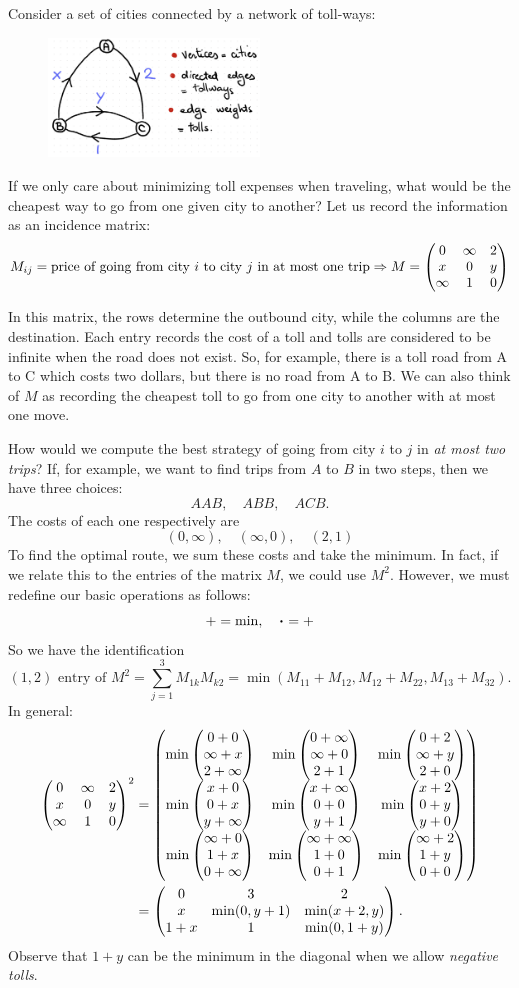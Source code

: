 \documentclass[12pt]{memoir}
\theoremstyle{definition}
\begin{document}
Consider a set of cities connected by a network of toll-ways:
\begin{figure}[h!]
    \centering
    \includegraphics[width=0.5\textwidth]{figs/fig1-2.png}
\end{figure}

If we only care about minimizing toll expenses when traveling, what would be the cheapest way to go from one given city to another? Let us record the information as an incidence matrix:
$$M_{ij}=\text{price of going from city }i\text{ to city }j\text{ in at most one trip}\Rightarrow M=\begin{pmatrix} 0 & \infty & 2 \\ x & 0 & y \\ \infty & 1 & 0 \end{pmatrix}$$

In this matrix, the rows determine the outbound city, while the columns are the destination. Each entry records the cost of a toll and tolls are considered to be infinite when the road does not exist. So, for example, there is a toll road from A to C which costs two dollars, but there is no road from A to B. We can also think of $M$ as recording the cheapest toll to go from one city to another with at most one move.\par 
How would we compute the best strategy of going from city $i$ to $j$ in \emph{at most two trips}? If, for example, we want to find trips from $A$ to $B$ in two steps, then we have three choices:
$$AAB,\quad ABB,\quad ACB.$$
The costs of each one respectively are 
$$(0,\infty),\quad (\infty,0),\quad (2,1)$$
To find the optimal route, we sum these costs and take the minimum. In fact, if we relate this to the entries of the matrix $M$, we could use $M^2$. However, we must redefine our basic operations as follows: 
$$+=\min,\quad\.=+$$
So we have the identification 
$$(1,2)\text{ entry of }M^2=\sum_{j=1}^{3}M_{1k}M_{k2}=\min(M_{11}+M_{12},M_{12}+M_{22},M_{13}+M_{32}).$$
In general:
\begin{align*}
    \begin{pmatrix} 0 & \infty & 2 \\ x & 0 & y \\ \infty & 1 & 0 \end{pmatrix}^2&=\begin{pmatrix} \min\begin{pmatrix} 0+0 \\ \infty+x \\ 2+\infty \end{pmatrix} & \min\begin{pmatrix} 0+\infty \\ \infty+0 \\ 2+1 \end{pmatrix} & \min\begin{pmatrix} 0+2 \\ \infty+y \\ 2+0 \end{pmatrix} \\ \min\begin{pmatrix} x+0 \\ 0+x \\ y+\infty \end{pmatrix} & \min\begin{pmatrix} x+\infty \\ 0+0 \\ y+1 \end{pmatrix} & \min\begin{pmatrix} x+2 \\ 0+y \\ y+0 \end{pmatrix} \\ \min\begin{pmatrix} \infty+0 \\ 1+x \\ 0+\infty \end{pmatrix} & \min\begin{pmatrix} \infty+\infty \\ 1+0 \\ 0+1 \end{pmatrix} & \min\begin{pmatrix} \infty+2 \\ 1+y \\ 0+0 \end{pmatrix} \end{pmatrix}\\
    &=\begin{pmatrix} 0 & 3 & 2 \\ x & \min(0,y+1) & \min(x+2,y) \\ 1+x & 1 & \min(0,1+y) \end{pmatrix}.
\end{align*}
Observe that $1+y$ can be the minimum in the diagonal when we allow \emph{negative tolls}.
\end{document}
